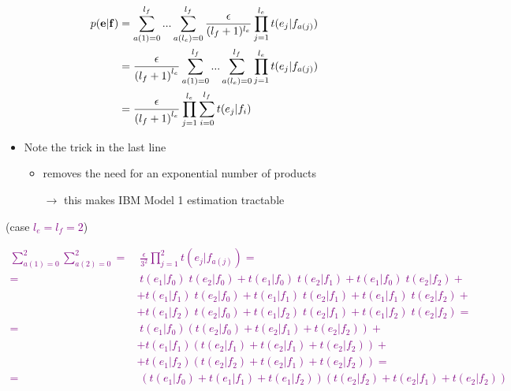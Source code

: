 \documentclass[landscape]{slides}
\newcommand{\maths}[1]{\textcolor{purple}{#1}}
\begin{document}
\vspace{5mm}
\maths{\begin{equation*}
\begin{split}
p({\bf e}|{\bf f})
&= \sum_{a(1)=0}^{l_f} ... \sum_{a(l_e)=0}^{l_f} 
\frac{\epsilon}{(l_f+1)^{l_e}} \prod_{j=1}^{l_e} t(e_j|f_{a(j)}) \\
&= \frac{\epsilon}{{(l_f+1)}^{l_e}}  \sum_{a(1)=0}^{l_f} ... \sum_{a(l_e)=0}^{l_f}
\prod_{j=1}^{l_e} t(e_j|f_{a(j)}) \\
&= \frac{\epsilon}{{(l_f+1)}^{l_e}} \prod_{j=1}^{l_e} \sum_{i=0}^{l_f} t(e_j|f_i)
\end{split}
\end{equation*}}
\begin{itemize}
\item Note the trick in the last line 
\begin{itemize} 
\item removes the need for an exponential number of products 
\item[$\rightarrow$] this makes IBM Model 1 estimation tractable
\end{itemize}
\end{itemize}



\begin{center}
(case \maths{$l_e=l_f=2$}) 
\end{center}
\maths{\begin{equation*}
\begin{split}
\sum_{a(1)=0}^2 \sum_{a(2)=0}^2 =
& \; \frac{\epsilon}{3^2} \prod_{j=1}^2 t(e_j|f_{a(j)}) =\\
= & \; t(e_1|f_0)\;t(e_2|f_0)
+ t(e_1|f_0)\;t(e_2|f_1)
+ t(e_1|f_0)\;t(e_2|f_2) +\\
& + t(e_1|f_1)\;t(e_2|f_0)
+ t(e_1|f_1)\;t(e_2|f_1)
+ t(e_1|f_1)\;t(e_2|f_2) +\\
& + t(e_1|f_2)\;t(e_2|f_0)
+ t(e_1|f_2)\;t(e_2|f_1)
+ t(e_1|f_2)\;t(e_2|f_2) = \\
= & \; t(e_1|f_0) \left( t(e_2|f_0) + t(e_2|f_1) + t(e_2|f_2) \right) +\\
& + t(e_1|f_1) \left( t(e_2|f_1) + t(e_2|f_1) + t(e_2|f_2) \right) +\\
& + t(e_1|f_2) \left( t(e_2|f_2) + t(e_2|f_1) + t(e_2|f_2) \right) =\\
= & \; \left( t(e_1|f_0) + t(e_1|f_1) + t(e_1|f_2) \right)
\left( t(e_2|f_2) + t(e_2|f_1) + t(e_2|f_2) \right)
\end{split}
\end{equation*}}
\end{document}
